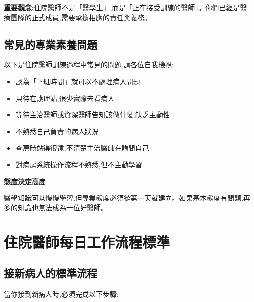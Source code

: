 \documentclass[12pt,a4paper]{article}
\newcommand{\note}[1]{
    \par
    \noindent
    \begin{tcolorbox}[
        colback=emergency_blue!5!white,
        colframe=emergency_blue,
        title=\textbf{重點提醒},
        fonttitle=\bfseries,
        boxrule=0.5pt,
        arc=3pt,
        left=6pt,
        right=6pt,
        top=6pt,
        bottom=6pt
    ]
    #1
    \end{tcolorbox}
}
\begin{document}
\note{
\textbf{重要觀念:}住院醫師不是「醫學生」,而是「正在接受訓練的醫師」。你們已經是醫療團隊的正式成員,需要承擔相應的責任與義務。
}

\subsection{常見的專業素養問題}

以下是住院醫師訓練過程中常見的問題,請各位自我檢視:

\begin{itemize}[leftmargin=*]
\item 認為「下班時間」就可以不處理病人問題
\item 只待在護理站,很少實際去看病人
\item 等待主治醫師或資深醫師告知該做什麼,缺乏主動性
\item 不熟悉自己負責的病人狀況
\item 查房時站得很遠,不清楚主治醫師在詢問自己
\item 對病房系統操作流程不熟悉,但不主動學習
\end{itemize}

\begin{importantbox}
\textbf{態度決定高度}

醫學知識可以慢慢學習,但專業態度必須從第一天就建立。如果基本態度有問題,再多的知識也無法成為一位好醫師。
\end{importantbox}

\newpage

\section{住院醫師每日工作流程標準}

\subsection{接新病人的標準流程}

當你接到新病人時,必須完成以下步驟:
\end{document}
